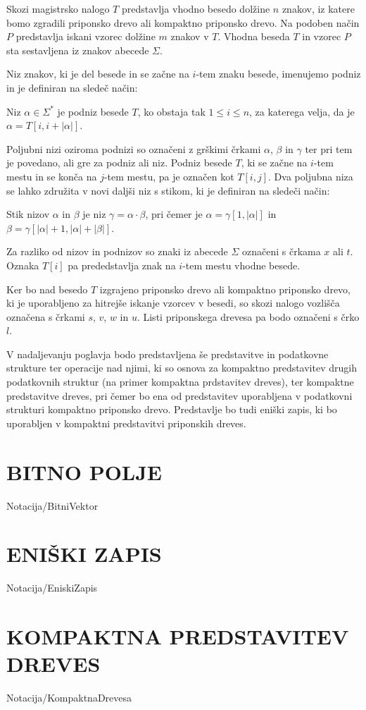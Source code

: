 Skozi magistrsko nalogo $T$ predstavlja vhodno besedo dolžine $n$ znakov, iz katere bomo zgradili priponsko drevo ali kompaktno priponsko drevo. Na podoben način $P$ predstavlja iskani vzorec dolžine $m$ znakov v $T$. Vhodna beseda $T$ in vzorec $P$ sta sestavljena iz znakov abecede $\Sigma$.

Niz znakov, ki je del besede in se začne na $i$-tem znaku besede, imenujemo podniz in je definiran na sledeč način:
\begin{defi}
    Niz $\alpha\in\Sigma^*$ je podniz besede $T$, ko obstaja tak $1\le i\le n$, za katerega velja, da je  $\alpha=T[i,i+|\alpha|]$. 
\end{defi}
Poljubni nizi oziroma podnizi so označeni z grškimi črkami $\alpha$, $\beta$ in $\gamma$ ter pri tem je povedano, ali gre za podniz ali niz. Podniz besede $T$, ki se začne na $i$-tem mestu in se konča na $j$-tem mestu, pa je označen kot $T[i,j]$. Dva poljubna niza se lahko združita v novi daljši niz s stikom, ki je definiran na sledeči način:
\begin{defi}
    Stik nizov $\alpha$ in $\beta$ je niz $\gamma=\alpha\cdot\beta$, pri čemer je $\alpha=\gamma[1,|\alpha|]$ in $\beta=\gamma[|\alpha|+1,|\alpha|+|\beta|]$.
\end{defi}

Za razliko od nizov in podnizov so znaki iz abecede $\Sigma$ označeni s črkama $x$ ali $t$. Oznaka $T[i]$ pa prededstavlja znak na $i$-tem mestu vhodne besede.

Ker bo nad besedo $T$ izgrajeno priponsko drevo ali kompaktno priponsko drevo, ki je uporabljeno za hitrejše iskanje vzorcev v besedi, so skozi nalogo vozlišča označena s črkami $s$, $v$, $w$ in $u$. Listi priponskega drevesa pa bodo označeni s črko $l$.

V nadaljevanju poglavja bodo predstavljena še predstavitve in podatkovne strukture ter operacije nad njimi, ki so osnova za kompaktno predstavitev drugih podatkovnih struktur (na primer kompaktna prdstavitev dreves), ter kompaktne predstavitve dreves, pri čemer bo ena od predstavitev uporabljena v podatkovni strukturi kompaktno priponsko drevo. Predstavlje bo tudi eniški zapis, ki bo uporabljen v kompaktni predstavitvi priponskih dreves.

\section{BITNO POLJE}\label{sec:Bitno_Polje}
{Notacija/BitniVektor}

\section{ENIŠKI ZAPIS}\label{sec:Eniski_Zapis}
{Notacija/EniskiZapis}

\section{KOMPAKTNA PREDSTAVITEV DREVES}\label{sec:kompaktna_drevesa}
{Notacija/KompaktnaDrevesa}